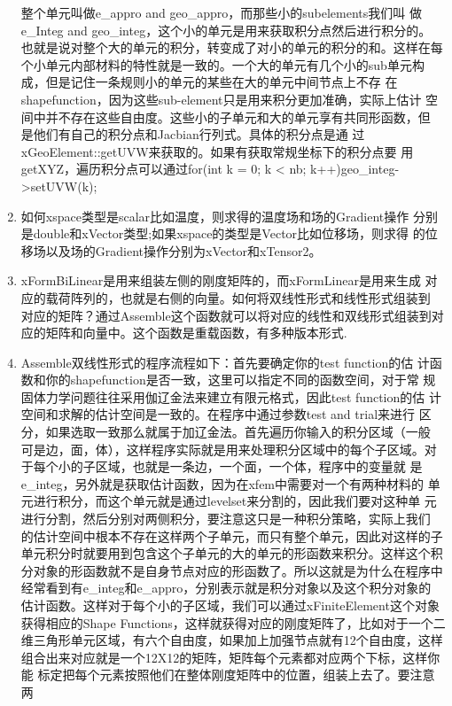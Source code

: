 \documentclass{article}
\begin{document}
\begin{enumerate}
  整个单元叫做e\_appro and geo\_appro，而那些小的subelements我们叫
  做e\_Integ and geo\_integ，这个小的单元是用来获取积分点然后进行积分的。
  也就是说对整个大的单元的积分，转变成了对小的单元的积分的和。这样在每
  个小单元内部材料的特性就是一致的。一个大的单元有几个小的sub单元构
  成，但是记住一条规则小的单元的某些在大的单元中间节点上不存
  在shapefunction，因为这些sub-element只是用来积分更加准确，实际上估计
  空间中并不存在这些自由度。这些小的子单元和大的单元享有共同形函数，但
  是他们有自己的积分点和Jacbian行列式。具体的积分点是通
  过xGeoElement::getUVW来获取的。如果有获取常规坐标下的积分点要
  用getXYZ，遍历积分点可以通过for(int k = 0; k < nb;
  k++)geo\_integ->setUVW(k);
\item 如何xspace类型是scalar比如温度，则求得的温度场和场的Gradient操作
  分别是double和xVector类型;如果xspace的类型是Vector比如位移场，则求得
  的位移场以及场的Gradient操作分别为xVector和xTensor2。
\item xFormBiLinear是用来组装左侧的刚度矩阵的，而xFormLinear是用来生成
  对应的载荷阵列的，也就是右侧的向量。如何将双线性形式和线性形式组装到
  对应的矩阵？通过Assemble这个函数就可以将对应的线性和双线形式组装到对
  应的矩阵和向量中。这个函数是重载函数，有多种版本形式.
\item Assemble双线性形式的程序流程如下：首先要确定你的test function的估
  计函数和你的shapefunction是否一致，这里可以指定不同的函数空间，对于常
  规固体力学问题往往采用伽辽金法来建立有限元格式，因此test function的估
  计空间和求解的估计空间是一致的。在程序中通过参数test and trial来进行
  区分，如果选取一致那么就属于加辽金法。首先遍历你输入的积分区域（一般
  可是边，面，体），这样程序实际就是用来处理积分区域中的每个子区域。对
  于每个小的子区域，也就是一条边，一个面，一个体，程序中的变量就
  是e\_integ，另外就是获取估计函数，因为在xfem中需要对一个有两种材料的
  单元进行积分，而这个单元就是通过levelset来分割的，因此我们要对这种单
  元进行分割，然后分别对两侧积分，要注意这只是一种积分策略，实际上我们
  的估计空间中根本不存在这样两个子单元，而只有整个单元，因此对这样的子
  单元积分时就要用到包含这个子单元的大的单元的形函数来积分。这样这个积
  分对象的形函数就不是自身节点对应的形函数了。所以这就是为什么在程序中
  经常看到有e\_integ和e\_appro，分别表示就是积分对象以及这个积分对象的
  估计函数。这样对于每个小的子区域，我们可以通过xFiniteElement这个对象
  获得相应的Shape Functions，这样就获得对应的刚度矩阵了，比如对于一个二
  维三角形单元区域，有六个自由度，如果加上加强节点就有12个自由度，这样
  组合出来对应就是一个12X12的矩阵，矩阵每个元素都对应两个下标，这样你能
  标定把每个元素按照他们在整体刚度矩阵中的位置，组装上去了。要注意两

\end{enumerate}
\end{document}
